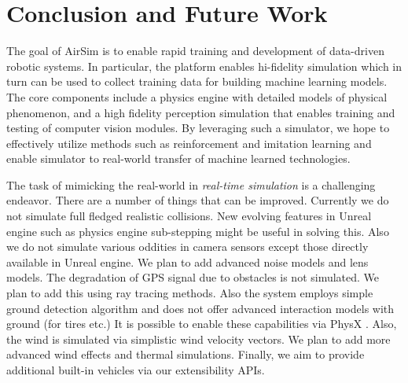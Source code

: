 \documentclass[graybox]{svmult}
\newcommand{\Name}{AirSim\xspace}
\begin{document}

\section{Conclusion and Future Work}
The goal of \Name is to enable rapid training and development of data-driven robotic systems. In particular, the platform enables hi-fidelity simulation which in turn can be used to collect training data for building machine learning models. The core components include a physics engine with detailed models of physical phenomenon, and a high fidelity perception simulation that enables training and testing of computer vision modules. By leveraging such a simulator, we hope to effectively utilize methods such as reinforcement and imitation learning and enable simulator to real-world transfer of machine learned technologies.

The task of mimicking the real-world in \emph{real-time simulation} is a challenging endeavor. There are a number of things that can be improved. Currently we do not simulate full fledged realistic collisions. New evolving features in Unreal engine such as physics engine sub-stepping might be useful in solving this. Also we do not simulate various oddities in camera sensors except those directly available in Unreal engine. We plan to add advanced noise models and lens models. The degradation of GPS signal due to obstacles is not simulated. We plan to add this using ray tracing methods. Also the system employs simple ground detection algorithm and does not offer advanced interaction models with ground (for tires etc.) It is possible to enable these capabilities via PhysX \cite{physx}. Also, the wind is simulated via simplistic wind velocity vectors. We plan to add more advanced wind effects and thermal simulations. Finally, we aim to provide additional built-in vehicles via our extensibility APIs.


{\footnotesize 
 }
\end{document}
